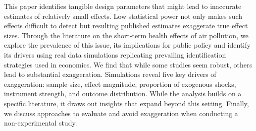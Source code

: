 
This paper identifies tangible design parameters that might lead to inaccurate estimates of relatively small effects. Low statistical power not only makes such effects difficult to detect but resulting published estimates exaggerate true effect sizes. Through the literature on the short-term health effects of air pollution, we explore the prevalence of this issue, its implications for public policy and identify its drivers using real data simulations replicating prevailing identification strategies used in economics. We find that while some studies seem robust, others lead to substantial exaggeration. Simulations reveal five key drivers of exaggeration: sample size, effect magnitude, proportion of exogenous shocks, instrument strength, and outcome distribution. While the analysis builds on a specific literature, it draws out insights that expand beyond this setting. Finally, we discuss approaches to evaluate and avoid exaggeration when conducting a non-experimental study.




